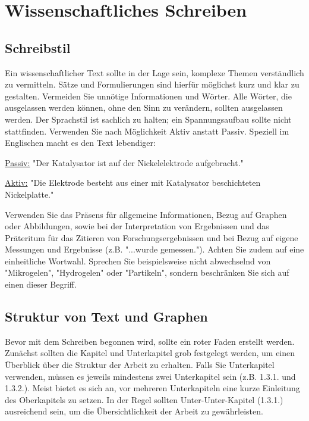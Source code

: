 \chapter{Wissenschaftliches Schreiben}

\section{Schreibstil}
    Ein wissenschaftlicher Text sollte in der Lage sein, komplexe Themen verständlich zu vermitteln. Sätze und Formulierungen sind hierfür möglichst kurz und klar zu gestalten. Vermeiden Sie unnötige Informationen und Wörter. Alle Wörter, die ausgelassen werden können, ohne den Sinn zu verändern, sollten ausgelassen werden. Der Sprachstil ist sachlich zu halten; ein Spannungsaufbau sollte nicht stattfinden. Verwenden Sie nach Möglichkeit Aktiv anstatt Passiv. Speziell im Englischen macht es den Text lebendiger:
    \begin{compactitem}
        \item \underline{Passiv:} "Der Katalysator ist auf der Nickelelektrode aufgebracht."
        \item \underline{Aktiv:} "Die Elektrode besteht aus einer mit Katalysator beschichteten Nickelplatte."
    \end{compactitem}
    Verwenden Sie das Präsens für allgemeine Informationen, Bezug auf Graphen oder Abbildungen, sowie bei der Interpretation von Ergebnissen und das Präteritum für das Zitieren von Forschungsergebnissen und bei Bezug auf eigene Messungen und Ergebnisse (z.B. "...wurde gemessen."). Achten Sie zudem auf eine einheitliche Wortwahl. Sprechen Sie beispielsweise nicht abwechselnd von "Mikrogelen", "Hydrogelen" oder "Partikeln", sondern beschränken Sie sich auf einen dieser Begriff.

\section{Struktur von Text und Graphen}

    Bevor mit dem Schreiben begonnen wird, sollte ein roter Faden erstellt werden. Zunächst sollten die Kapitel und Unterkapitel grob festgelegt werden, um einen Überblick über die Struktur der Arbeit zu erhalten. Falls Sie Unterkapitel verwenden, müssen es jeweils mindestens zwei Unterkapitel sein (z.B. 1.3.1. und 1.3.2.). Meist bietet es sich an, vor mehreren Unterkapiteln eine kurze Einleitung des Oberkapitels zu setzen. In der Regel sollten Unter-Unter-Kapitel (1.3.1.) ausreichend sein, um die Übersichtlichkeit der Arbeit zu gewährleisten.
    
